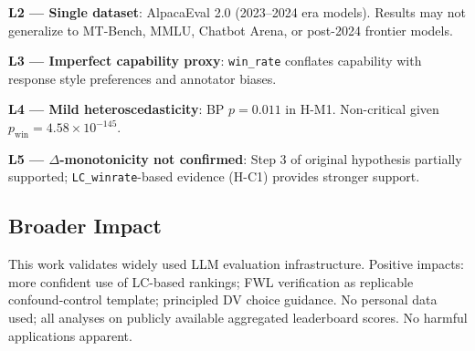 \textbf{L2 --- Single dataset}: AlpacaEval 2.0 (2023--2024 era models). Results may not
generalize to MT-Bench, MMLU, Chatbot Arena, or post-2024 frontier models.

\textbf{L3 --- Imperfect capability proxy}: \texttt{win\_rate} conflates capability with
response style preferences and annotator biases.

\textbf{L4 --- Mild heteroscedasticity}: BP $p = 0.011$ in H-M1. Non-critical given
$p_{\mathrm{win}} = 4.58 \times 10^{-145}$.

\textbf{L5 --- $\Delta$-monotonicity not confirmed}: Step 3 of original hypothesis partially
supported; \texttt{LC\_winrate}-based evidence (H-C1) provides stronger support.

\subsection{Broader Impact}

This work validates widely used LLM evaluation infrastructure. Positive impacts: more confident
use of LC-based rankings; FWL verification as replicable confound-control template; principled
DV choice guidance. No personal data used; all analyses on publicly available aggregated
leaderboard scores. No harmful applications apparent.
